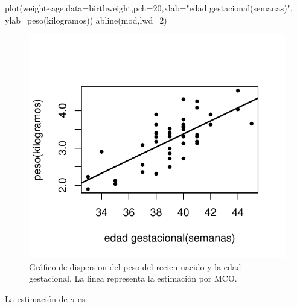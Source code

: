 \documentclass[
]{article}
\newenvironment{Shaded}{\begin{snugshade}}{\end{snugshade}}
\newcommand{\AttributeTok}[1]{\textcolor[rgb]{0.77,0.63,0.00}{#1}}
\newcommand{\DecValTok}[1]{\textcolor[rgb]{0.00,0.00,0.81}{#1}}
\newcommand{\FunctionTok}[1]{\textcolor[rgb]{0.00,0.00,0.00}{#1}}
\newcommand{\NormalTok}[1]{#1}
\newcommand{\SpecialCharTok}[1]{\textcolor[rgb]{0.00,0.00,0.00}{#1}}
\newcommand{\StringTok}[1]{\textcolor[rgb]{0.31,0.60,0.02}{#1}}
\begin{document}
\begin{Shaded}
\begin{Highlighting}[]
\FunctionTok{plot}\NormalTok{(weight}\SpecialCharTok{\textasciitilde{}}\NormalTok{age,}\AttributeTok{data=}\NormalTok{birthweight,}\AttributeTok{pch=}\DecValTok{20}\NormalTok{,}\AttributeTok{xlab=}\StringTok{"edad gestacional(semanas)"}\NormalTok{,}
     \AttributeTok{ylab=}\StringTok{\textquotesingle{}peso(kilogramos)\textquotesingle{}}\NormalTok{)}
\FunctionTok{abline}\NormalTok{(mod,}\AttributeTok{lwd=}\DecValTok{2}\NormalTok{)}
\end{Highlighting}
\end{Shaded}

\begin{figure}

{\centering \includegraphics{MLGI_files/figure-latex/FigMCO2-1} 

}

\caption{Gráfico de dispersion del peso del recien nacido y la edad gestacional. La linea representa la estimación por MCO.}\label{fig:FigMCO2}
\end{figure}

La estimación de \(\sigma\) es:

\begin{Shaded}
\end{Shaded}
\end{document}
